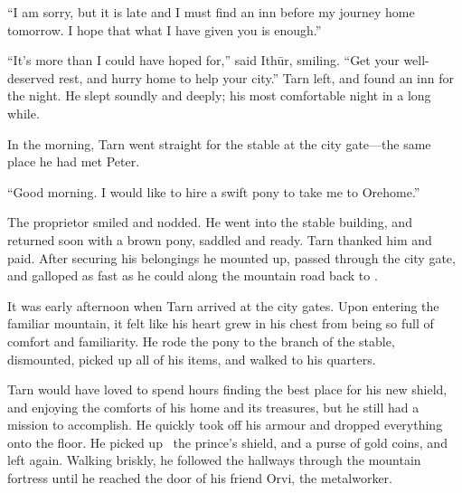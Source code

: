 ``I am sorry, but it is late and I must find an inn before my journey home tomorrow.  I hope that what I have given you is enough.''

``It's more than I could have hoped for,'' said Ith\=ur, smiling.  ``Get your well-deserved rest, and hurry home to help your city.''  Tarn left, and found an inn for the night.  He slept soundly and deeply; his most comfortable night in a long while.

In the morning, Tarn went straight for the stable at the city gate---the same place he had met Peter.

``Good morning.  I would like to hire a swift pony to take me to Orehome.''

The proprietor smiled and nodded.  He went into the stable building, and returned soon with a brown pony, saddled and ready.  Tarn thanked him and paid.  After securing his belongings he mounted up, passed through the city gate, and galloped as fast as he could along the mountain road back to \korbarthrond.

It was early afternoon when Tarn arrived at the city gates.  Upon entering the familiar mountain, it felt like his heart grew in his chest from being so full of comfort and familiarity.  He rode the pony to the \korbarthrond branch of the stable, dismounted, picked up all of his items, and walked to his quarters.

Tarn would have loved to spend hours finding the best place for his new shield, and enjoying the comforts of his home and its treasures, but he still had a mission to accomplish.  He quickly took off his armour and dropped everything onto the floor. He picked up \kildir\, the prince's shield, and a purse of gold coins, and left again.  Walking briskly, he followed the hallways through the mountain fortress until he reached the door of his friend Orvi, the metalworker.